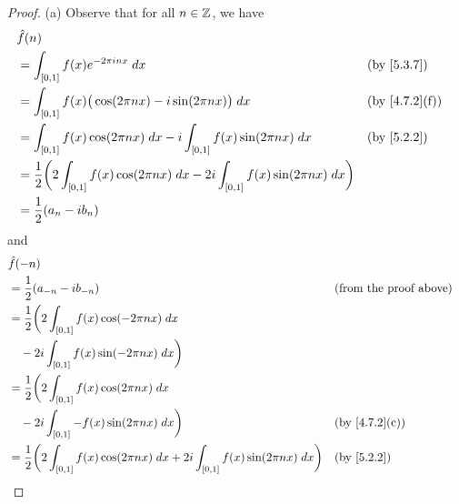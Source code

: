 \begin{proof}{(a)}
  Observe that for all \(n \in \mathbb{Z}\), we have
  \begin{align*}
     & \hat{f}(n)                                                                                                                                           \\
     & = \int_{[0, 1]} f(x) e^{- 2 \pi i n x} \; dx                                                                        &  & \text{(by \cref{5.3.7})}    \\
     & = \int_{[0, 1]} f(x) \big(\cos(2 \pi n x) - i \sin(2 \pi n x)\big) \; dx                                            &  & \text{(by \cref{4.7.2}(f))} \\
     & = \int_{[0, 1]} f(x) \cos(2 \pi n x) \; dx - i \int_{[0, 1]} f(x) \sin(2 \pi n x) \; dx                             &  & \text{(by \cref{5.2.2})}    \\
     & = \dfrac{1}{2} \bigg(2 \int_{[0, 1]} f(x) \cos(2 \pi n x) \; dx - 2i \int_{[0, 1]} f(x) \sin(2 \pi n x) \; dx\bigg)                                  \\
     & = \dfrac{1}{2} (a_n - i b_n)
  \end{align*}
  and
  \begin{align*}
     & \hat{f}(-n)                                                                                                                                            \\
     & = \dfrac{1}{2} (a_{-n} - i b_{-n})                                                                                  &  & \text{(from the proof above)} \\
     & = \dfrac{1}{2} \bigg(2 \int_{[0, 1]} f(x) \cos(- 2 \pi n x) \; dx                                                                                      \\
     & \quad - 2i \int_{[0, 1]} f(x) \sin(- 2 \pi n x) \; dx\bigg)                                                                                            \\
     & = \dfrac{1}{2} \bigg(2 \int_{[0, 1]} f(x) \cos(2 \pi n x) \; dx                                                                                        \\
     & \quad - 2i \int_{[0, 1]} -f(x) \sin(2 \pi n x) \; dx\bigg)                                                          &  & \text{(by \cref{4.7.2}(c))}   \\
     & = \dfrac{1}{2} \bigg(2 \int_{[0, 1]} f(x) \cos(2 \pi n x) \; dx + 2i \int_{[0, 1]} f(x) \sin(2 \pi n x) \; dx\bigg) &  & \text{(by \cref{5.2.2})}      \\

\end{align*}
\end{proof}
